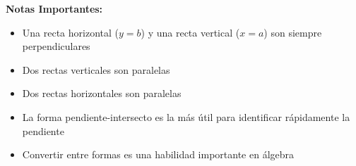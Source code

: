 \textbf{Notas Importantes:}
\begin{itemize}
    \item Una recta horizontal ($y = b$) y una recta vertical ($x = a$) son siempre perpendiculares
    \item Dos rectas verticales son paralelas
    \item Dos rectas horizontales son paralelas
    \item La forma pendiente-intersecto es la más útil para identificar rápidamente la pendiente
    \item Convertir entre formas es una habilidad importante en álgebra
\end{itemize}
